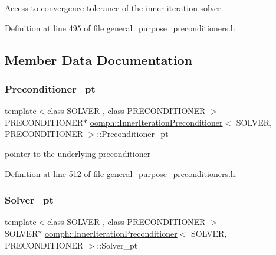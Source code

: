 Access to convergence tolerance of the inner iteration solver. 



Definition at line 495 of file general\+\_\+purpose\+\_\+preconditioners.\+h.



\subsection{Member Data Documentation}
\mbox{\label{classoomph_1_1InnerIterationPreconditioner_af778d9a0b911a786ba2398d7af8a4c9d}} 
\subsubsection{\texorpdfstring{Preconditioner\+\_\+pt}{Preconditioner\_pt}}
{\footnotesize\ttfamily template$<$class S\+O\+L\+V\+ER , class P\+R\+E\+C\+O\+N\+D\+I\+T\+I\+O\+N\+ER $>$ \\
P\+R\+E\+C\+O\+N\+D\+I\+T\+I\+O\+N\+ER$\ast$ \hyperlink{classoomph_1_1InnerIterationPreconditioner}{oomph\+::\+Inner\+Iteration\+Preconditioner}$<$ S\+O\+L\+V\+ER, P\+R\+E\+C\+O\+N\+D\+I\+T\+I\+O\+N\+ER $>$\+::Preconditioner\+\_\+pt\hspace{0.3cm}{\ttfamily [private]}}



pointer to the underlying preconditioner 



Definition at line 512 of file general\+\_\+purpose\+\_\+preconditioners.\+h.

\mbox{\label{classoomph_1_1InnerIterationPreconditioner_aa90724100b8878bf2ae812b25153e9e6}} 
\subsubsection{\texorpdfstring{Solver\+\_\+pt}{Solver\_pt}}
{\footnotesize\ttfamily template$<$class S\+O\+L\+V\+ER , class P\+R\+E\+C\+O\+N\+D\+I\+T\+I\+O\+N\+ER $>$ \\
S\+O\+L\+V\+ER$\ast$ \hyperlink{classoomph_1_1InnerIterationPreconditioner}{oomph\+::\+Inner\+Iteration\+Preconditioner}$<$ S\+O\+L\+V\+ER, P\+R\+E\+C\+O\+N\+D\+I\+T\+I\+O\+N\+ER $>$\+::Solver\+\_\+pt\hspace{0.3cm}{\ttfamily [private]}}



